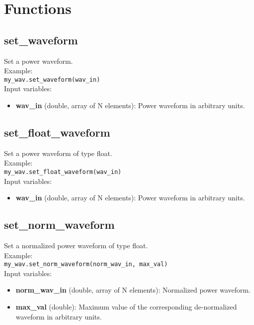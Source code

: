 \section{Functions}

\subsection{set\_waveform}

Set a power waveform.\\

Example:\\

\texttt{my\_wav.set\_waveform(wav\_in)}\\

Input variables:
\begin{itemize}
\item {\bf wav\_in} (double, array of N elements): Power waveform in arbitrary units.
\end{itemize}


\subsection{set\_float\_waveform}

Set a power waveform of type float.\\

Example:\\

\texttt{my\_wav.set\_float\_waveform(wav\_in)}\\

Input variables:
\begin{itemize}
\item {\bf wav\_in} (double, array of N elements): Power waveform in arbitrary units.
\end{itemize}


\subsection{set\_norm\_waveform}

Set a normalized power waveform of type float.\\

Example:\\

\texttt{my\_wav.set\_norm\_waveform(norm\_wav\_in, max\_val)}\\

Input variables:
\begin{itemize}
\item {\bf norm\_wav\_in} (double, array of N elements): Normalized power waveform.
\item {\bf max\_val} (double): Maximum value of the corresponding de-normalized waveform in arbitrary units.
\end{itemize}


